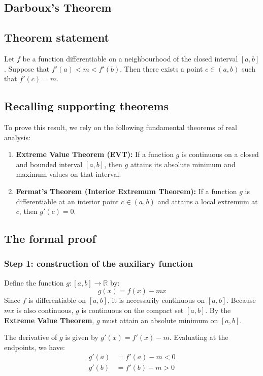 \begin{notechapter}
\chapter{Darboux's Theorem}\label{ch:darboux-theorem}

\section{Theorem statement}
Let $f$ be a function differentiable on a neighbourhood of the closed interval $[a, b]$. Suppose that $f'(a) < m < f'(b)$. Then there exists a point $c \in (a, b)$ such that $f'(c) = m$.

\section{Recalling supporting theorems}
To prove this result, we rely on the following fundamental theorems of real analysis:

\begin{enumerate}
    \item \textbf{Extreme Value Theorem (EVT):} If a function $g$ is continuous on a closed and bounded interval $[a, b]$, then $g$ attains its absolute minimum and maximum values on that interval.
    \item \textbf{Fermat's Theorem (Interior Extremum Theorem):} If a function $g$ is differentiable at an interior point $c \in (a, b)$ and attains a local extremum at $c$, then $g'(c) = 0$.
\end{enumerate}

\section{The formal proof}

\subsection{Step 1: construction of the auxiliary function}
Define the function $g: [a, b] \to \mathbb{R}$ by:
\[ g(x) = f(x) - mx \]
Since $f$ is differentiable on $[a, b]$, it is necessarily continuous on $[a, b]$. Because $mx$ is also continuous, $g$ is continuous on the compact set $[a, b]$. By the \textbf{Extreme Value Theorem}, $g$ must attain an absolute minimum on $[a, b]$. 

The derivative of $g$ is given by $g'(x) = f'(x) - m$. Evaluating at the endpoints, we have:
\begin{align*}
    g'(a) &= f'(a) - m < 0 \\
    g'(b) &= f'(b) - m > 0
\end{align*}


\end{notechapter}
